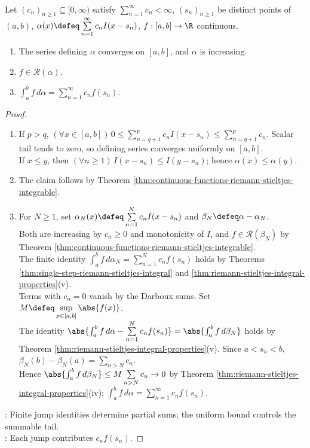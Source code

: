 \begin{theorem} \label{thm:pure-step-riemann-stieltjes-series} \\
Let $(c_n)_{n\geq1}\subseteq[0,\infty)$ satisfy $\sum\limits_{n=1}^{\infty}c_n<\infty$, $(s_n)_{n\geq1}$ be distinct points of $(a,b)$, $\alpha(x)\defeq\sum\limits_{n=1}^{\infty}c_nI(x-s_n)$, $f:[a,b]\to\R$ continuous.
\begin{enumerate}[label=(\roman*)]
\setlength{\itemsep}{0pt}
\item The series defining $\alpha$ converges on $[a,b]$, and $\alpha$ is increasing.
\item $f\in\mathcal{R}(\alpha)$.
\item $\int_a^b f\,d\alpha=\sum\limits_{n=1}^{\infty}c_nf(s_n)$.
\end{enumerate}
\begin{proof}
\begin{enumerate}[label=(\roman*)]
\setlength{\itemsep}{0pt}
\item If $p>q$, $(\forall x\in[a,b])\,0\leq\sum\limits_{n=q+1}^{p}c_nI(x-s_n)\leq\sum\limits_{n=q+1}^{p}c_n$. Scalar tail tends to zero, so defining series converges uniformly on $[a,b]$.\\
If $x\leq y$, then $(\forall n\geq1)\,I(x-s_n)\leq I(y-s_n)$; hence $\alpha(x)\leq\alpha(y)$.
\item The claim follows by Theorem \ref{thm:continuous-functions-riemann-stieltjes-integrable}.
\item For $N\geq1$, set $\alpha_N(x)\defeq\sum\limits_{n=1}^{N}c_nI(x-s_n)$ and $\beta_N\defeq\alpha-\alpha_N$.\\
Both are increasing by $c_n\geq0$ and monotonicity of $I$, and $f\in\mathcal{R}(\beta_N)$ by Theorem \ref{thm:continuous-functions-riemann-stieltjes-integrable}.\\
The finite identity $\int_a^b f\,d\alpha_N=\sum\limits_{n=1}^{N}c_nf(s_n)$ holds by Theorems \ref{thm:single-step-riemann-stieltjes-integral} and \ref{thm:riemann-stieltjes-integral-properties}(v).\\
Terms with $c_n=0$ vanish by the Darboux sums. Set $M\defeq\sup\limits_{x\in[a,b]}\abs{f(x)}$.\\
The identity $\abs{\int_a^b f\,d\alpha-\sum\limits_{n=1}^{N}c_nf(s_n)}=\abs{\int_a^b f\,d\beta_N}$ holds by Theorem \ref{thm:riemann-stieltjes-integral-properties}(v). Since $a<s_n<b$, $\beta_N(b)-\beta_N(a)=\sum\limits_{n>N}c_n$.\\
Hence $\abs{\int_a^b f\,d\beta_N}\leq M\sum\limits_{n>N}c_n\to0$ by Theorem \ref{thm:riemann-stieltjes-integral-properties}(iv); $\int_a^b f\,d\alpha=\sum\limits_{n=1}^{\infty}c_nf(s_n)$.
\end{enumerate}
: Finite jump identities determine partial sums; the uniform bound controls the summable tail.\\
: Each jump contributes $c_nf(s_n)$.
\end{proof}
\end{theorem}

